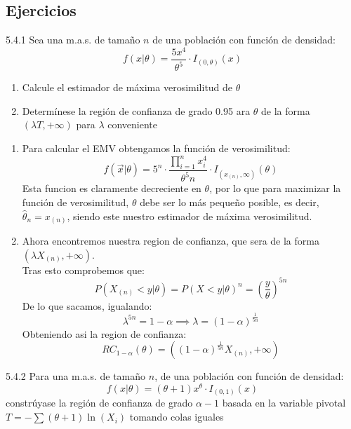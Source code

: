 \subsection{Ejercicios}
\begin{problem}{5.4.1}    Sea una m.a.s. de tamaño $n$ de una población con función de densidad: 
    $$f(x | \theta) = \frac{5x^4}{\theta^5} \cdot I_{(0, \theta)}(x)$$
    \begin{enumerate}
        \item Calcule el estimador de máxima verosimilitud de $\theta$
        \item Determínese la región de confianza de grado 0.95 ara $\theta$ de la forma $(\lambda  T, +\infty)$ para $\lambda$ conveniente
    \end{enumerate}
\end{problem}
\begin{sol}
    \begin{enumerate}
        \item Para calcular el EMV obtengamos la función de verosimilitud:
        $$ f(\vec{x} | \theta) = 5^n \cdot \frac{\prod_{i=1}^{n}x_i^4}{\theta^5n} \cdot I_{(x_{(n)}, \infty)}(\theta)$$ 
        Esta funcion es claramente decreciente en $\theta$, por lo que para maximizar la función de verosimilitud, $\theta$ debe ser lo más pequeño posible, es decir, $\hat{\theta}_{n} = x_{(n)}$, siendo este nuestro estimador de máxima verosimilitud. \\
    
        \item Ahora encontremos nuestra region de confianza, que sera de la forma $(\lambda X_{(n)}, +\infty)$.\\
        Tras esto comprobemos que:
        $$P(X_{(n)} < y | \theta) = P(X < y | \theta)^n = \left(\frac{y}{\theta}\right)^{5n}$$
        De lo que sacamos, igualando:
        $$ \lambda^{5n} = 1 - \alpha \implies \lambda = (1 - \alpha)^{\frac{1}{5n}}$$
        Obteniendo asi la region de confianza:
        $$ RC_{1-\alpha}(\theta) = \left((1 - \alpha)^{\frac{1}{5n}}X_{(n)}, +\infty\right)$$
    \end{enumerate}   
\end{sol}
\begin{problem}{5.4.2}
    Para una m.a.s. de tamaño $n$, de una población con función de densidad: 
    $$f(x | \theta) = (\theta + 1)x^{\theta} \cdot I_{(0, 1)}(x)$$
    constrúyase la región de confianza de grado $\alpha -1$ basada en la variable pivotal $T= -\sum (\theta +1)\ln(X_i)$ tomando colas iguales
\end{problem}
